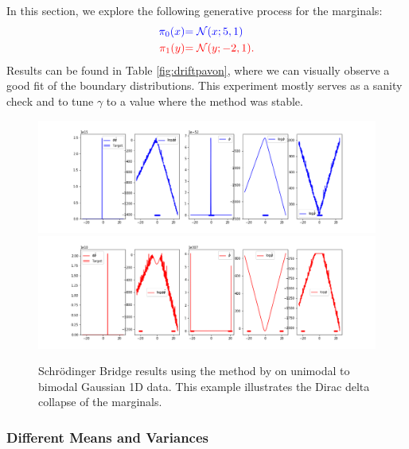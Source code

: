 \documentclass[a4paper,12pt,twoside,openright]{report}
\theoremstyle{definition}
\begin{document}
In this section, we explore the following generative process for the marginals:
\begin{align*}
\color{blue}{\pi_0(x)} &\color{blue}{= {\mathcal{N}}(x; 5,  1)} \\
    \color{red}{\pi_1(y)} &\color{red}{= {\mathcal{N}}(y; -2, 1)}. 
\end{align*}
Results can be found in Table \ref{fig:driftpavon}, where we can visually observe a good fit of the boundary distributions. This experiment mostly serves as a sanity check and to tune $\gamma$ to a value where the method was stable.

\begin{figure}[t]
    \centering
    \includegraphics[scale=0.4,trim={2.3cm 0.2cm 1.5cm 0}, clip]{images/Pavon/Forward_unimodal_test_working_convex.png} \\\vspace{-0.2cm}
    \includegraphics[scale=0.4,trim={2.3cm 0 1.5cm 1.5cm}, clip]{images/Pavon/Backward_unimodal_test_working_convex.png} 
    \caption{Schrödinger Bridge results using the method by \cite{pavon2018data} on unimodal to bimodal Gaussian 1D data. This example illustrates the Dirac delta collapse of the marginals.}
    \label{fig:small_delta_collapse}
\end{figure}
\subsubsection{Different Means and Variances}
\end{document}
